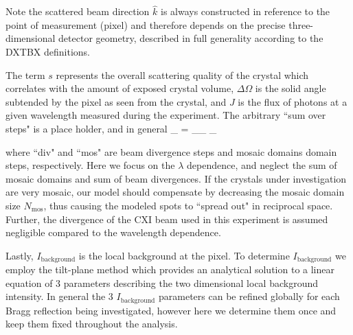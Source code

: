 \documentclass[dists.tex]{subfiles}
\begin{document}
Note the scattered beam direction $\hat k$ is always constructed in reference to the point of measurement (pixel) and therefore depends on the precise three-dimensional detector geometry, described in full generality according to the DXTBX definitions.

The term $s$ represents the overall scattering quality of the crystal which correlates with the amount of exposed crystal volume, $\Delta \Omega$ is the solid angle subtended by the pixel as seen from the crystal, and $J$ is the flux of photons at a given wavelength measured during the experiment. The arbitrary ``sum over steps" is a place holder, and in general
\be \label{equ:steps}
\sum_ = \sum_\lambda \sum_ \sum_ 
\ee

where ``div" and ``mos" are beam divergence steps and mosaic domains domain steps, respectively.  Here we focus on the $\lambda$ dependence, and neglect the sum of mosaic domains and sum of beam divergences. If the crystals under investigation are very mosaic, our model should compensate by decreasing the mosaic domain size $N_\text{mos}$, thus causing the modeled spots to ``spread out" in reciprocal space. Further, the divergence of the CXI beam used in this experiment is assumed negligible compared to the wavelength dependence. 

Lastly,  $I_\text{background}$ is the local background at the pixel. To determine $I_\text{background}$ we employ the tilt-plane method which provides an analytical solution to a linear equation of 3 parameters describing the two dimensional local background intensity. In general the 3 $I_\text{background}$ parameters can be refined globally for each Bragg reflection being investigated, however here we determine them once and keep them fixed throughout the analysis.
\end{document}
